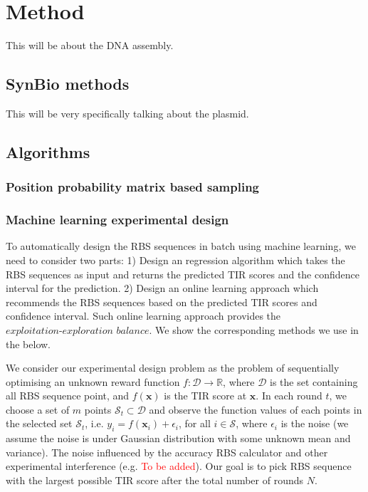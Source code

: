 \section{Method}
This will be about the DNA assembly.\\
\subsection{SynBio methods}
This will be very specifically talking about the plasmid.

\subsection{Algorithms}

\subsubsection{ Position probability matrix based sampling}


\subsubsection{Machine learning experimental design}

To automatically design the RBS sequences in batch using machine learning, we need to consider two parts: 
1) Design an regression algorithm which takes the RBS sequences as input and returns the predicted TIR scores and the confidence interval for the prediction. 
2) Design an online learning approach which recommends the RBS sequences based on the predicted TIR scores and confidence interval. 
Such online learning approach provides the $\textit{exploitation-exploration balance}$. 
We show the corresponding methods we use in the below. 

We consider our experimental design problem as the problem of sequentially optimising an unknown reward function $f: \mathcal{D} \rightarrow \mathbb{R}$, where $\mathcal{D}$ is the set containing all RBS sequence point, and $f(\mathbf{x})$ is the TIR score at $\mathbf{x}$. 
In each round $t$, we choose a set of $m$ points $\mathcal{S}_t \subset \mathcal{D}$ and observe the function values of each points in the selected set $\mathcal{S}_t$, i.e. $y_i = f(\mathbf{x}_i) + \epsilon_i$, for all $i \in \mathcal{S}$, where $\epsilon_i$ is the noise (we assume the noise is under Gaussian distribution with some unknown mean and variance). 
The noise influenced by the accuracy RBS calculator and other experimental interference (e.g. \textcolor{red}{To be added}). 
Our goal is to pick RBS sequence with the largest possible TIR score after the total number of rounds $N$. 

